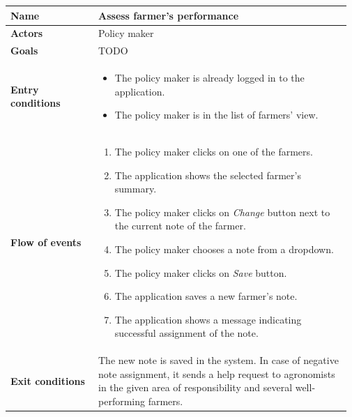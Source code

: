 \begin{table}[H]
    \centering
	\begin{tabular}{@{}p{0.25\linewidth} p{0.72\linewidth}@{}}
\toprule
		\textbf{Name}               & Assess farmer's performance\\
		\midrule
		\textbf{Actors}             & Policy maker\\
		\midrule
		\textbf{Goals}              & TODO \\
		\midrule
		
		\textbf{Entry conditions}   & \begin{itemize}[leftmargin=.4cm,noitemsep,topsep=0pt,before=\vspace{-3mm},after=\vspace{-4mm}]
		    \item The policy maker is already logged in to the application.
		    \item The policy maker is in the list of farmers' view. 
		\end{itemize}\\
		\midrule
		
		\textbf{Flow of events}     & \begin{enumerate}[leftmargin=.4cm,noitemsep,topsep=0pt,before=\vspace{-3mm},after=\vspace{-4mm}]
		    \item The policy maker clicks on one of the farmers.
		    \item The application shows the selected farmer's summary.
		    \item The policy maker clicks on \textit{Change} button next to the current note of the farmer.
		    \item The policy maker chooses a note from a dropdown.
		    \item The policy maker clicks on \textit{Save} button.
		    \item The application saves a new farmer's note.
		    \item The application shows a message indicating successful assignment of the note.
		\end{enumerate}\\
		\midrule
		\textbf{Exit conditions}    & The new note is saved in the system. In case of negative note assignment, it sends a help request to agronomists in the given area of responsibility and several well-performing farmers. \\
		\midrule
		

\end{tabular}
\end{table}
